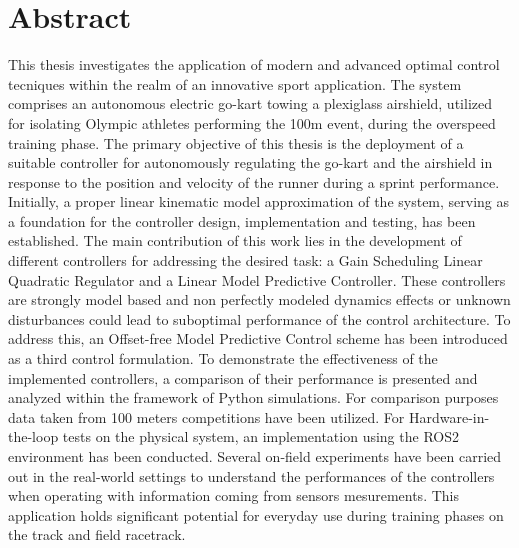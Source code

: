 \documentclass[a4paper,12pt,oneside]{book}
\begin{document}
\vfill

\newpage
\thispagestyle{empty}



%


%


\chapter*{Abstract}
This thesis investigates the application of modern and advanced optimal control tecniques within the realm of an innovative sport application. 
The system comprises an autonomous electric go-kart towing a plexiglass airshield, utilized for isolating Olympic athletes performing the 100m event, during the overspeed training phase.
The primary objective of this thesis is the deployment of a suitable controller for autonomously regulating the go-kart and the airshield in response to the position and velocity of the runner during a sprint performance. 
Initially, a proper linear kinematic model approximation of the system, serving as a foundation for the controller design, implementation and testing, has been established.
The main contribution of this work lies in the development of different controllers for addressing the desired task: a Gain Scheduling Linear Quadratic Regulator and a Linear Model Predictive Controller.
These controllers are strongly model based and non perfectly modeled dynamics effects or unknown disturbances could lead to suboptimal performance of the control architecture.
 To address this, an Offset-free Model Predictive Control scheme has been introduced as a third control formulation.
To demonstrate the effectiveness of the implemented controllers, a comparison of their performance is presented and analyzed within the framework of Python simulations. 
For comparison purposes data taken from 100 meters competitions have been utilized.
For Hardware-in-the-loop tests on the physical system, an implementation using the ROS2 environment has been conducted.
Several on-field experiments have been carried out in the real-world settings to understand the performances of the controllers when operating with information coming from sensors mesurements.
This application holds significant potential for everyday use during training phases on the track and field racetrack.
\end{document}
